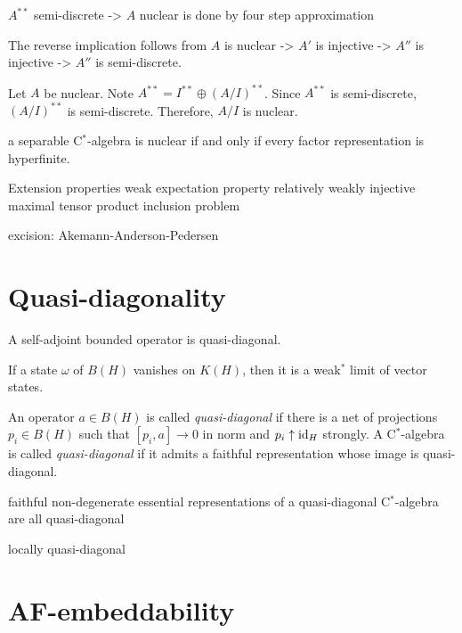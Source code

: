 \documentclass{../../large}
\begin{document}
$A^{**}$ semi-discrete -> $A$ nuclear is done by four step approximation

The reverse implication follows from $A$ is nuclear -> $A'$ is injective -> $A''$ is injective -> $A''$ is semi-discrete.


Let $A$ be nuclear.
Note $A^{**}=I^{**}\oplus(A/I)^{**}$.
Since $A^{**}$ is semi-discrete, $(A/I)^{**}$ is semi-discrete.
Therefore, $A/I$ is nuclear.








a separable C$^*$-algebra is nuclear if and only if every factor representation is hyperfinite.

Extension properties
weak expectation property
relatively weakly injective
maximal tensor product inclusion problem



excision: Akemann-Anderson-Pedersen

\section{Quasi-diagonality}

\begin{prb}
A self-adjoint bounded operator is quasi-diagonal.
\end{prb}

\begin{prb}
If a state $\omega$ of $B(H)$ vanishes on $K(H)$, then it is a weak$^*$ limit of vector states.
\end{prb}

\begin{prb}
\end{prb}


\begin{prb}
An operator $a\in B(H)$ is called \emph{quasi-diagonal} if there is a net of projections $p_i\in B(H)$ such that $[p_i,a]\to0$ in norm and $p_i\uparrow\operatorname{id}_H$ strongly.
A C$^*$-algebra is called \emph{quasi-diagonal} if it admits a faithful representation whose image is quasi-diagonal.
\end{prb}

faithful non-degenerate essential representations of a quasi-diagonal C$^*$-algebra are all quasi-diagonal

locally quasi-diagonal

\section{AF-embeddability}
\end{document}
